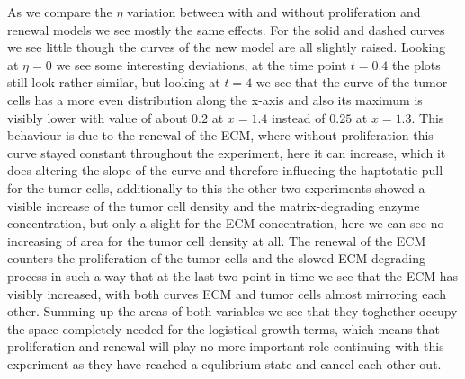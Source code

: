 As we compare the $\eta$ variation between with and without proliferation and renewal models we see mostly the same effects. For the solid and dashed curves we see little though the curves of the new model are all slightly raised. Looking at $\eta=0$ we see some interesting deviations, at the time point $t=0.4$ the plots still look rather similar, but looking at $t=4$ we see that the curve of the tumor cells has a more even distribution along the x-axis and also its maximum is visibly lower with value of about $0.2$ at $x=1.4$ instead of $0.25$ at $x=1.3$. This behaviour is due to the renewal of the ECM, where without proliferation this curve stayed constant throughout the experiment, here it can increase, which it does altering the slope of the curve and therefore influecing the haptotatic pull for the tumor cells, additionally to this the other two experiments showed a visible increase of the tumor cell density and the matrix-degrading enzyme concentration, but only a slight for the ECM concentration, here we can see no increasing of area for the tumor cell density at all. The renewal of the ECM counters the proliferation of the tumor cells and the slowed ECM degrading process in such a way that at the last two point in time we see that the ECM has visibly increased, with both curves ECM and tumor cells almost mirroring each other. Summing up the areas of both variables we see that they toghether occupy the space completely needed for the logistical growth terms, which means that proliferation and renewal will play no more important role continuing with this experiment as they have reached a equlibrium state and cancel each other out. 



